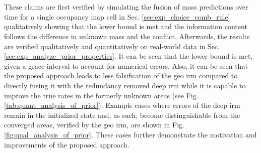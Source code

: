 \\\\
These claims are first verified by simulating the fusion of mass predictions over time for a single occupancy map cell in Sec. \ref{sec:exp_choice_comb_rule} qualitatively showing that the lower bound is met and the information content follows the difference in unknown mass and the conflict. Afterwards, the results are verified qualitatively and quantitatively on real-world data in Sec. \ref{sec:exp_analyze_prior_properties}. It can be seen that the lower bound is met, given a grace interval to account for numerical errors. Also, it can be seen that the proposed approach leads to less falsification of the geo \gls{irm} compared to directly fusing it with the redundancy removed deep \gls{irm} while it is capable to improve the true rates in the formerly unknown areas (see Fig. \ref{tab:quant_analysis_of_prior}). Example cases where errors of the deep \gls{irm} remain in the initialized state and, as such, become distinguishable from the converged areas, verified by the geo \gls{irm}, are shown in Fig. \ref{fig:qual_analysis_of_prior}. These cases further demonstrate the motivation and improvements of the proposed approach.